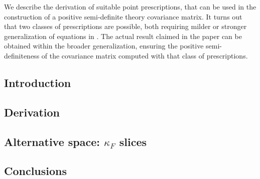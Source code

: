 
We describe the derivation of suitable point prescriptions, that can be
used in the construction of a positive semi-definite theory covariance
matrix.
It turns out that two classes of prescriptions are possible, both requiring
milder or stronger generalization of equations in \cite{NNPDF:2019ubu}.
The actual result claimed in the paper can be obtained within the broader
generalization, ensuring the positive semi-definiteness of the covariance
matrix computed with that class of prescriptions.

\subsection{Introduction}
\label{sec:intro}


\subsection{Derivation}
\label{sec:deriv}


\subsection{Alternative space: $\kappa_F$ slices}
\label{sec:slices}


\subsection{Conclusions}
\label{sec:concl}

